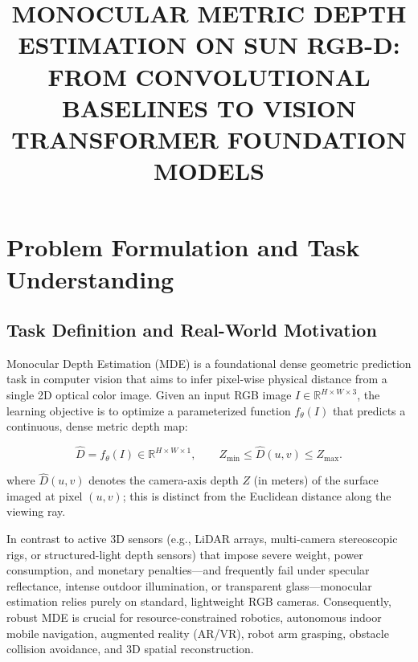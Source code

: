 \documentclass[twoside,final]{hcmut-report}
\title{MONOCULAR METRIC DEPTH ESTIMATION ON SUN RGB-D:\\ FROM CONVOLUTIONAL BASELINES TO VISION TRANSFORMER FOUNDATION MODELS}
\begin{document}
\coverpage%

\tableofcontents

\clearpage





\FloatBarrier

\section{Problem Formulation and Task Understanding}

\label{sec:problem_formulation}

\subsection{Task Definition and Real-World Motivation}

Monocular Depth Estimation (MDE) is a foundational dense geometric prediction task in computer vision that aims to infer pixel-wise physical distance from a single 2D optical color image. Given an input RGB image $I \in \mathbb{R}^{H \times W \times 3}$, the learning objective is to optimize a parameterized function $f_\theta(I)$ that predicts a continuous, dense metric depth map:

\begin{equation}
\hat{D}=f_{\theta}(I)\in\mathbb{R}^{H\times W\times 1},
\qquad Z_{\min}\leq\hat{D}(u,v)\leq Z_{\max}.
\end{equation}

where $\hat{D}(u, v)$ denotes the camera-axis depth $Z$ (in meters) of the surface imaged at pixel $(u,v)$; this is distinct from the Euclidean distance along the viewing ray.

In contrast to active 3D sensors (e.g., LiDAR arrays, multi-camera stereoscopic rigs, or structured-light depth sensors) that impose severe weight, power consumption, and monetary penalties—and frequently fail under specular reflectance, intense outdoor illumination, or transparent glass—monocular estimation relies purely on standard, lightweight RGB cameras. Consequently, robust MDE is crucial for resource-constrained robotics, autonomous indoor mobile navigation, augmented reality (AR/VR), robot arm grasping, obstacle collision avoidance, and 3D spatial reconstruction.
\end{document}
